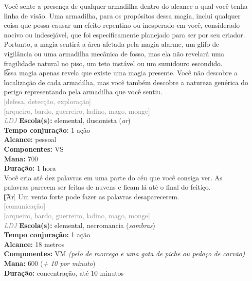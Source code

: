 \documentclass{RPG_Adventure}[2021/10/20]
\begin{document}
{\normalsize Você sente a presença de qualquer armadilha dentro do alcance a qual você tenha linha de visão. Uma armadilha, para os propósitos dessa magia, inclui qualquer coisa que possa causar um efeito repentino ou inesperado em você, considerado nocivo ou indesejável, que foi especificamente planejado para ser por seu criador. Portanto, a magia sentirá a área afetada pela magia alarme, um glifo de vigilância ou uma armadilha mecânica de fosso, mas ela não revelará uma fragilidade natural no piso, um teto instável ou um sumidouro escondido.\\\t Essa magia apenas revela que existe uma magia presente. Você não descobre a localização de cada armadilha, mas você também descobre a natureza genérica do perigo representando pela armadilha que você sentiu.\\}
{\scriptsize \textcolor{gray}{[defesa, detecção, exploração]\\}}
{\scriptsize \textcolor{gray}{[arqueiro, bardo, guerreiro, ladino, mago, monge]\\}}
{\tiny \textcolor{gray}{\textit{LDJ}}}\jump{}
{\small \t \textbf{Escola(s):} elemental, ilusionista (\textit{ar})\\\t \textbf{Tempo conjuração:} 1 ação\\\t \textbf{Alcance:} pessoal\\\t \textbf{Componentes:} VS\\\t \textbf{Mana:} 700\\\t \textbf{Duração:} 1 hora\\}
{\normalsize Você cria até dez palavras em uma parte do céu que você consiga ver. As palavras parecem ser feitas de nuvens e ficam lá até o final do feitiço.\\\t [Ar] Um vento forte pode fazer as palavras desaparecerem.\\}
{\scriptsize \textcolor{gray}{[comunicação]\\}}
{\scriptsize \textcolor{gray}{[arqueiro, bardo, guerreiro, ladino, mago, monge]\\}}
{\tiny \textcolor{gray}{\textit{LDJ}}}\jump{}
{\small \t \textbf{Escola(s):} elemental, necromancia (\textit{sombras})\\\t \textbf{Tempo conjuração:} 1 ação\\\t \textbf{Alcance:} 18 metros\\\t \textbf{Componentes:} VM \textit{(pelo de morcego e uma gota de piche ou pedaço de carvão)}\\\t \textbf{Mana:} 600 (\textit{+ 10 por minuto})\\\t \textbf{Duração:} concentração, até 10 minutos\\}
\end{document}
